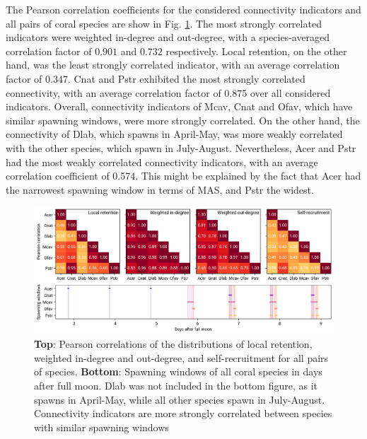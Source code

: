 \documentclass[preprint,12pt,authoryear]{elsarticle}
\begin{document}
The Pearson correlation coefficients for the considered connectivity indicators and all pairs of coral species are show  in Fig. \ref{fig:correlation}. The most strongly correlated indicators were weighted in-degree and out-degree, with a species-averaged correlation factor of $0.901$ and $0.732$ respectively. Local retention, on the other hand, was the least strongly correlated indicator, with an average correlation factor of 0.347. Cnat and Pstr exhibited the most strongly correlated connectivity, with an average correlation factor of 0.875 over all considered indicators. Overall, connectivity indicators of Mcav, Cnat and Ofav, which have similar spawning windows, were more strongly correlated. On the other hand, the connectivity of Dlab, which spawns in April-May, was more weakly correlated with the other species, which spawn in July-August. Nevertheless, Acer and Pstr had the most weakly correlated connectivity indicators, with an average correlation coefficient of 0.574. This might be explained by the fact that Acer had the narrowest spawning window in terms of MAS, and Pstr the widest.

\begin{figure}
    \centering
    \includegraphics[width=\textwidth]{figures/fig_correlation.png}
    \caption{\textbf{Top}: Pearson correlations of the distributions of local retention, weighted in-degree and out-degree, and self-recruitment for all pairs of species. \textbf{Bottom}: Spawning windows of all coral species in days after full moon. Dlab was not included in the bottom figure, as it spawns in April-May, while all other species spawn in July-August. Connectivity indicators are more strongly correlated between species with similar spawning windows}\label{fig:correlation}
\end{figure}
\end{document}
